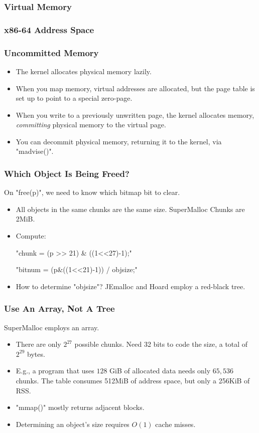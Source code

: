 \documentclass[xcolor=dvipsnames,14pt]{beamer}
\begin{document}
\begin{frame}
\frametitle{Virtual Memory}
\end{frame}


\begin{frame}[fragile]
\frametitle{x86-64 Address Space}


\end{frame}

\begin{frame}[fragile]
\frametitle{Uncommitted Memory}

\begin{itemize}
\item The kernel allocates physical memory lazily.
\item When you map memory, virtual addresses are allocated, but the page table is set up to point to a special zero-page.
\item When you write to a previously unwritten page, the kernel allocates memory, \textit{committing} physical memory to the virtual page.
\item You can decommit physical memory, returning it to the kernel, via "madvise()".
\end{itemize}

\end{frame}

\begin{frame}[fragile]
\frametitle{Which Object Is Being Freed?}

On "free(p)", we need to know which bitmap bit to clear.
\begin{itemize}
\item All objects in the same chunks are the same size.  SuperMalloc Chunks are 2MiB.

\item Compute:

  "chunk  = (p >> 21) & ((1<<27)-1);"

  "bitnum = (p&((1<<21)-1)) / objsize;"

\item How to determine "objsize"?
JEmalloc and Hoard employ a red-black tree.
\end{itemize}
\end{frame}

\begin{frame}[fragile]
\frametitle{Use An Array, Not A Tree}

SuperMalloc employs an array.
\begin{itemize}
\item There are only $2^{27}$ possible chunks.  Need 32 bits to code the size, a total of
$2^{29}$ bytes.

\item E.g., a program that uses $128$ GiB of allocated data needs only
  $65,536$ chunks.  The table consumes 512MiB of address space, but
  only a 256KiB of RSS.

\item "mmap()" mostly returns adjacent blocks.

\item Determining an object's size requires $O(1)$ cache misses.
\end{itemize}
\end{frame}
\end{document}
